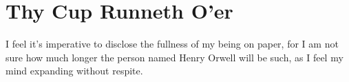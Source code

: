 \chapter*{Thy Cup Runneth O'er}


I feel it's imperative to disclose the fullness of my being on paper, for I am not sure how much longer the person named Henry Orwell will be such, as I feel my mind expanding without respite.
